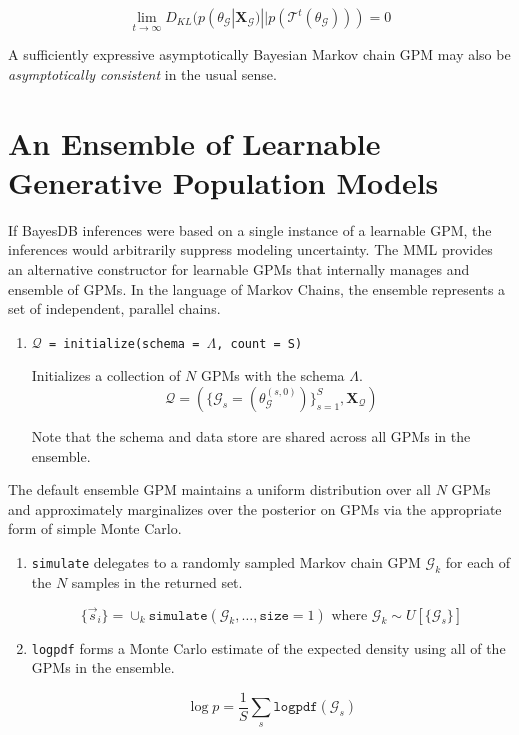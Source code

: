 \documentclass[10pt,letterpaper]{article}
\newcommand{\set}[1]{\{#1\}}
\begin{document}
\begin{equation*}
\lim_{t\to\infty}D_{KL}(p(\theta_\mathcal{G}|\mathbf{X_\mathcal{G}}) ||
p(\mathcal{T}^t(\theta_\mathcal{G}))) = 0
\end{equation*}

A sufficiently expressive asymptotically Bayesian Markov chain GPM may also be
\textit{asymptotically consistent} in the usual sense.

\section{An Ensemble of Learnable Generative Population Models}
\label{sec:ensemble}

If BayesDB inferences were based on a single instance of a learnable GPM, the
inferences would arbitrarily suppress modeling uncertainty. The MML provides an
alternative constructor for learnable GPMs that internally manages and ensemble
of GPMs. In the language of Markov Chains, the ensemble represents a set of
independent, parallel chains.

\begin{enumerate}
\item \texttt{$\mathcal{Q}$ = initialize(schema = $\Lambda$, count = S)}

    Initializes a collection of $N$ GPMs with the schema $\Lambda$.
    $$
    \mathcal{Q} = 
    (\set{\mathcal{G}_s = (\theta_{\mathcal{G}}^{(s,0)})}_{s=1}^S,
    \mathbf{X_\mathcal{Q}})
    $$

    Note that the schema and data store are shared across all GPMs in the
    ensemble.
\end{enumerate}

The default ensemble GPM maintains a uniform distribution over all $N$ GPMs and
approximately marginalizes over the posterior on GPMs via the appropriate form
of simple Monte Carlo.

\begin{enumerate}
\item \texttt{simulate} delegates to a randomly sampled Markov chain GPM
$\mathcal{G}_k$ for each of the $N$ samples in the returned set.

    $$
    \set{\vec{s}_i} = \cup_k \texttt{simulate} (\mathcal{G}_k,\dots,\texttt{size} = 1) \text{ where }
    \mathcal{G}_k \sim U[\set{\mathcal{G}_s}]
    $$

\item \texttt{logpdf} forms a Monte Carlo estimate of the expected density using
all of the GPMs in the ensemble.

    $$
    \log p = \frac{1}{S}\sum_s\texttt{logpdf}(\mathcal{G}_s)
    $$
\end{enumerate}
\end{document}
